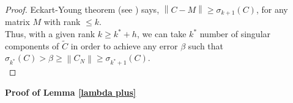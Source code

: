 \documentclass[11pt]{article}
\newcommand{\rank}{\operatorname{rank}}
\newcommand{\norm}[1]{\left\|#1\right\|}
\begin{document}
\begin{proof}
%
Eckart-Young theorem (see \cite{HJ}) says,  $\norm{C - M} \geq \sigma_{k+1}(C)$, for any matrix $M$ with rank $\leq k$.\\
 Thus, with a given rank $k \geq k^* + h$, we can take $k^*$ number of singular components of $\tilde{C}$ in order to achieve any error $\beta$ such that $ \sigma_{k^*}(C) > \beta \geq \norm{C_N} \geq \sigma_{k^*+1}(C)$.\\
%
\end{proof}
%
\noindent \textbf{Proof of Lemma \ref{lambda plus}}
%
\end{document}
